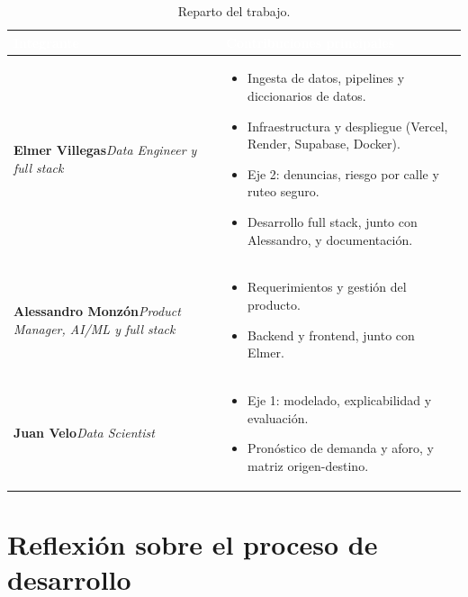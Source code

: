 \documentclass[11pt]{article}
\begin{document}
\begin{table}[H]
\centering\small
\begin{tabularx}{\textwidth}{@{}>{\raggedright\arraybackslash}p{4.4cm}X@{}}
\toprule
\rowcolor{tablehead} \textcolor{white}{\bfseries Integrante} & \textcolor{white}{\bfseries Contribuciones principales} \\
\midrule
\textbf{Elmer Villegas}\newline\textit{Data Engineer y full stack} &
\begin{itemize}[nosep,leftmargin=1em]
  \item Ingesta de datos, pipelines y diccionarios de datos.
  \item Infraestructura y despliegue (Vercel, Render, Supabase, Docker).
  \item Eje 2: denuncias, riesgo por calle y ruteo seguro.
  \item Desarrollo full stack, junto con Alessandro, y documentación.
\end{itemize} \\
\rowcolor{tablerow} \textbf{Alessandro Monzón}\newline\textit{Product Manager, AI/ML y full stack} &
\begin{itemize}[nosep,leftmargin=1em]
  \item Requerimientos y gestión del producto.
  \item Backend y frontend, junto con Elmer.
\end{itemize} \\
\textbf{Juan Velo}\newline\textit{Data Scientist} &
\begin{itemize}[nosep,leftmargin=1em]
  \item Eje 1: modelado, explicabilidad y evaluación.
  \item Pronóstico de demanda y aforo, y matriz origen-destino.
\end{itemize} \\
\bottomrule
\end{tabularx}
\caption{Reparto del trabajo.}
\end{table}

\section{Reflexión sobre el proceso de desarrollo}
\label{sec:refl}
\end{document}
